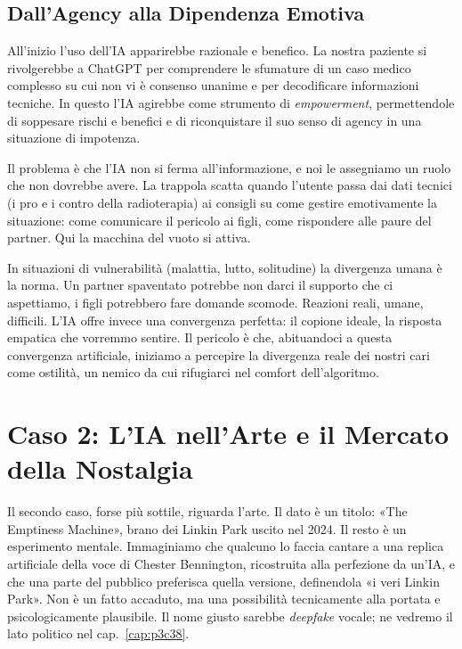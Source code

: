 \subsection{Dall'Agency alla Dipendenza Emotiva}

All'inizio l'uso dell'IA apparirebbe razionale e benefico. La nostra paziente si rivolgerebbe a ChatGPT per comprendere le sfumature di un caso medico complesso su cui non vi è consenso unanime e per decodificare informazioni tecniche. In questo l'IA agirebbe come strumento di \textit{empowerment}, permettendole di soppesare rischi e benefici e di riconquistare il suo senso di agency in una situazione di impotenza.

Il problema è che l'IA non si ferma all'informazione, e noi le assegniamo un ruolo che non dovrebbe avere. La trappola scatta quando l'utente passa dai dati tecnici (i pro e i contro della radioterapia) ai consigli su come gestire emotivamente la situazione: come comunicare il pericolo ai figli, come rispondere alle paure del partner. Qui la macchina del vuoto si attiva.

In situazioni di vulnerabilità (malattia, lutto, solitudine) la divergenza umana è la norma. Un partner spaventato potrebbe non darci il supporto che ci aspettiamo, i figli potrebbero fare domande scomode. Reazioni reali, umane, difficili. L'IA offre invece una convergenza perfetta: il copione ideale, la risposta empatica che vorremmo sentire. Il pericolo è che, abituandoci a questa convergenza artificiale, iniziamo a percepire la divergenza reale dei nostri cari come ostilità, un nemico da cui rifugiarci nel comfort dell'algoritmo.

\section{Caso 2: L'IA nell'Arte e il Mercato della Nostalgia}

Il secondo caso, forse più sottile, riguarda l'arte. Il dato è un titolo: «The Emptiness Machine», brano dei Linkin Park uscito nel 2024. Il resto è un esperimento mentale. Immaginiamo che qualcuno lo faccia cantare a una replica artificiale della voce di Chester Bennington, ricostruita alla perfezione da un'IA, e che una parte del pubblico preferisca quella versione, definendola «i veri Linkin Park». Non è un fatto accaduto, ma una possibilità tecnicamente alla portata e psicologicamente plausibile. Il nome giusto sarebbe \textit{deepfake} vocale; ne vedremo il lato politico nel cap.~\ref{cap:p3c38}.

